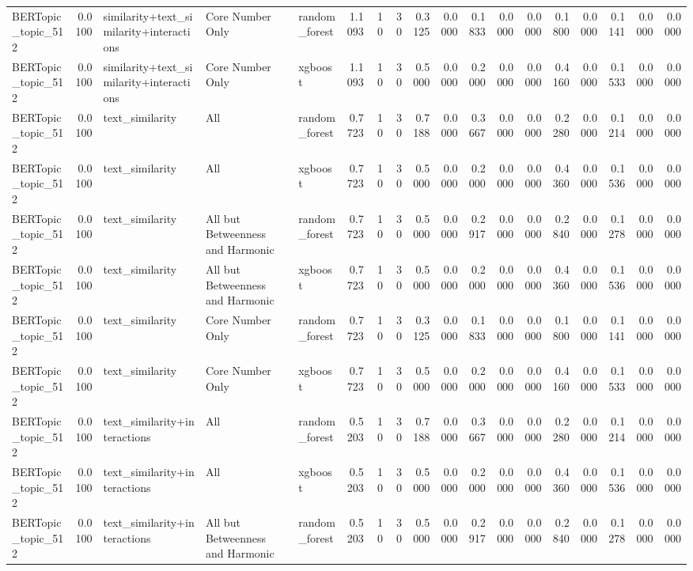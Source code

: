 \begin{tabular}{lrlllrrrrrrrrrrrrr}
BERTopic_topic_512 & 0.0100 & similarity+text_similarity+interactions & Core Number Only & random_forest & 1.1093 & 10 & 30 & 0.3125 & 0.0000 & 0.1833 & 0.0000 & 0.0000 & 0.1800 & 0.0000 & 0.1141 & 0.0000 & 0.0000 \\
BERTopic_topic_512 & 0.0100 & similarity+text_similarity+interactions & Core Number Only & xgboost & 1.1093 & 10 & 30 & 0.5000 & 0.0000 & 0.2000 & 0.0000 & 0.0000 & 0.4160 & 0.0000 & 0.1533 & 0.0000 & 0.0000 \\
BERTopic_topic_512 & 0.0100 & text_similarity & All & random_forest & 0.7723 & 10 & 30 & 0.7188 & 0.0000 & 0.3667 & 0.0000 & 0.0000 & 0.2280 & 0.0000 & 0.1214 & 0.0000 & 0.0000 \\
BERTopic_topic_512 & 0.0100 & text_similarity & All & xgboost & 0.7723 & 10 & 30 & 0.5000 & 0.0000 & 0.2000 & 0.0000 & 0.0000 & 0.4360 & 0.0000 & 0.1536 & 0.0000 & 0.0000 \\
BERTopic_topic_512 & 0.0100 & text_similarity & All but Betweenness and Harmonic & random_forest & 0.7723 & 10 & 30 & 0.5000 & 0.0000 & 0.2917 & 0.0000 & 0.0000 & 0.2840 & 0.0000 & 0.1278 & 0.0000 & 0.0000 \\
BERTopic_topic_512 & 0.0100 & text_similarity & All but Betweenness and Harmonic & xgboost & 0.7723 & 10 & 30 & 0.5000 & 0.0000 & 0.2000 & 0.0000 & 0.0000 & 0.4360 & 0.0000 & 0.1536 & 0.0000 & 0.0000 \\
BERTopic_topic_512 & 0.0100 & text_similarity & Core Number Only & random_forest & 0.7723 & 10 & 30 & 0.3125 & 0.0000 & 0.1833 & 0.0000 & 0.0000 & 0.1800 & 0.0000 & 0.1141 & 0.0000 & 0.0000 \\
BERTopic_topic_512 & 0.0100 & text_similarity & Core Number Only & xgboost & 0.7723 & 10 & 30 & 0.5000 & 0.0000 & 0.2000 & 0.0000 & 0.0000 & 0.4160 & 0.0000 & 0.1533 & 0.0000 & 0.0000 \\
BERTopic_topic_512 & 0.0100 & text_similarity+interactions & All & random_forest & 0.5203 & 10 & 30 & 0.7188 & 0.0000 & 0.3667 & 0.0000 & 0.0000 & 0.2280 & 0.0000 & 0.1214 & 0.0000 & 0.0000 \\
BERTopic_topic_512 & 0.0100 & text_similarity+interactions & All & xgboost & 0.5203 & 10 & 30 & 0.5000 & 0.0000 & 0.2000 & 0.0000 & 0.0000 & 0.4360 & 0.0000 & 0.1536 & 0.0000 & 0.0000 \\
BERTopic_topic_512 & 0.0100 & text_similarity+interactions & All but Betweenness and Harmonic & random_forest & 0.5203 & 10 & 30 & 0.5000 & 0.0000 & 0.2917 & 0.0000 & 0.0000 & 0.2840 & 0.0000 & 0.1278 & 0.0000 & 0.0000 \\

\end{tabular}
